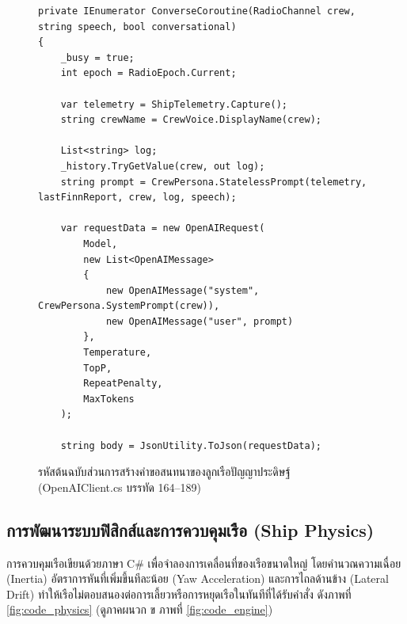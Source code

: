 \begin{figure}[!htbp]
\centering
\begin{lstlisting}[language={[Sharp]C},basicstyle=\ttfamily\footnotesize,firstnumber=164]
private IEnumerator ConverseCoroutine(RadioChannel crew, string speech, bool conversational)
{
    _busy = true;
    int epoch = RadioEpoch.Current;

    var telemetry = ShipTelemetry.Capture();
    string crewName = CrewVoice.DisplayName(crew);

    List<string> log;
    _history.TryGetValue(crew, out log);
    string prompt = CrewPersona.StatelessPrompt(telemetry, lastFinnReport, crew, log, speech);

    var requestData = new OpenAIRequest(
        Model,
        new List<OpenAIMessage>
        {
            new OpenAIMessage("system", CrewPersona.SystemPrompt(crew)),
            new OpenAIMessage("user", prompt)
        },
        Temperature,
        TopP,
        RepeatPenalty,
        MaxTokens
    );

    string body = JsonUtility.ToJson(requestData);
\end{lstlisting}
\caption{รหัสต้นฉบับส่วนการสร้างคำขอสนทนาของลูกเรือปัญญาประดิษฐ์ (OpenAIClient.cs บรรทัด 164--189)}
\label{fig:code_ai_crew}
\end{figure}

\subsection{การพัฒนาระบบฟิสิกส์และการควบคุมเรือ (Ship Physics)}
การควบคุมเรือเขียนด้วยภาษา C\# เพื่อจำลองการเคลื่อนที่ของเรือขนาดใหญ่ โดยคำนวณความเฉื่อย (Inertia) อัตราการหันที่เพิ่มขึ้นทีละน้อย (Yaw Acceleration) และการไถลด้านข้าง (Lateral Drift) ทำให้เรือไม่ตอบสนองต่อการเลี้ยวหรือการหยุดเรือในทันทีที่ได้รับคำสั่ง ดังภาพที่ \ref{fig:code_physics} (ดูภาคผนวก ข ภาพที่ \ref{fig:code_engine})

